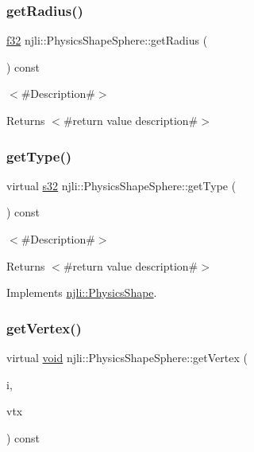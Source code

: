 \subsubsection{\texorpdfstring{get\+Radius()}{getRadius()}}
{\footnotesize\ttfamily \mbox{\hyperlink{_util_8h_a5f6906312a689f27d70e9d086649d3fd}{f32}} njli\+::\+Physics\+Shape\+Sphere\+::get\+Radius (\begin{DoxyParamCaption}{ }\end{DoxyParamCaption}) const}

$<$\#\+Description\#$>$

\begin{DoxyReturn}{Returns}
$<$\#return value description\#$>$ 
\end{DoxyReturn}
\mbox{\label{classnjli_1_1_physics_shape_sphere_a04a15e2a5226fdc9b920750b3d9b6af8}} 
\subsubsection{\texorpdfstring{get\+Type()}{getType()}}
{\footnotesize\ttfamily virtual \mbox{\hyperlink{_util_8h_aa62c75d314a0d1f37f79c4b73b2292e2}{s32}} njli\+::\+Physics\+Shape\+Sphere\+::get\+Type (\begin{DoxyParamCaption}{ }\end{DoxyParamCaption}) const\hspace{0.3cm}{\ttfamily [virtual]}}

$<$\#\+Description\#$>$

\begin{DoxyReturn}{Returns}
$<$\#return value description\#$>$ 
\end{DoxyReturn}


Implements \mbox{\hyperlink{classnjli_1_1_physics_shape_ac7c6b2ac373892095f8220d56f8ad6de}{njli\+::\+Physics\+Shape}}.

\mbox{\label{classnjli_1_1_physics_shape_sphere_a6087255ff18c442470b790409261edf9}} 
\subsubsection{\texorpdfstring{get\+Vertex()}{getVertex()}}
{\footnotesize\ttfamily virtual \mbox{\hyperlink{_thread_8h_af1e856da2e658414cb2456cb6f7ebc66}{void}} njli\+::\+Physics\+Shape\+Sphere\+::get\+Vertex (\begin{DoxyParamCaption}\item[{int}]{i,  }\item[{bt\+Vector3 \&}]{vtx }\end{DoxyParamCaption}) const\hspace{0.3cm}{\ttfamily [virtual]}}

